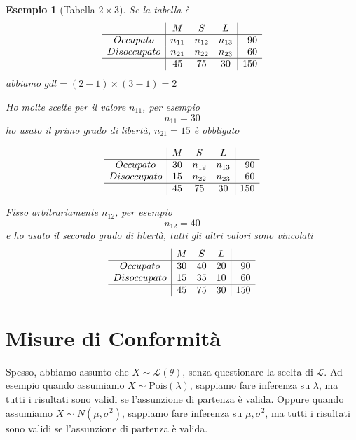 \documentclass[
  11pt,
]{book}
\theoremstyle{mytheoremstyle}
\theoremstyle{mydefstyle}
\newtheorem{example}{{Esempio}}[section]
\begin{document}
\begin{example}[Tabella $2\times 3$]
Se la tabella è
\[
\begin{array}{c|ccc|r}
         &M &S &L  & \\   \hline
Occupato    & n_{11}     & n_{12}     & n_{13}     & 90\\
Disoccupato & n_{21}     & n_{22}     & n_{23}     & 60\\ \hline
         & 45 & 75 & 30 & 150
\end{array}
\]
abbiamo \(gdl=(2-1)\times(3-1)=2\)

Ho molte scelte per il valore \(n_{11}\), per esempio
\[n_{11}=30\]
ho usato il primo grado di libertà, \(n_{21}=15\) è obbligato

\[
\begin{array}{c|ccc|r}
         &M &S &L  & \\   \hline
Occupato    & 30     & n_{12}     & n_{13}     & 90\\
Disoccupato & 15     & n_{22}     & n_{23}     & 60\\ \hline
         & 45 & 75 & 30 & 150
\end{array}
\]

Fisso arbitrariamente \(n_{12}\), per esempio
\[n_{12}=40\]
e ho usato il secondo grado di libertà, tutti gli altri valori sono vincolati
\[
\begin{array}{c|ccc|r}
         &M &S &L  & \\   \hline
Occupato    & 30     & 40     & 20     & 90\\
Disoccupato & 15     & 35     & 10     & 60\\ \hline
         & 45 & 75 & 30 & 150
\end{array}
\]
\end{example}

\section{Misure di Conformità}\label{misure-di-conformituxe0}

Spesso, abbiamo assunto che \(X\sim\mathscr{L}(\theta)\), senza questionare la scelta di
\(\mathscr{L}\). Ad esempio quando assumiamo \(X\sim\text{Pois}(\lambda)\), sappiamo fare inferenza su
\(\lambda\), ma tutti i risultati sono validi se l'assunzione di partenza è valida.
Oppure quando assumiamo \(X\sim N(\mu,\sigma^2)\), sappiamo fare inferenza su
\(\mu,\sigma^2\), ma tutti i risultati sono validi se l'assunzione di partenza è valida.
\end{document}
